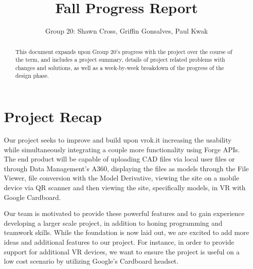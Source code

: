 \documentclass[10pt,draftclsnofoot,onecolumn]{IEEEtran}
\begin{document}
\title{Fall Progress Report}
\author{Group 20: Shawn Cross, Griffin Gonsalves, Paul Kwak}
\maketitle
\hspace*{\fill}\hspace*{\fill}
\vspace{2cm}
\begin{abstract}
This document expands upon Group 20's progress with the project over the course of the term, and includes a project summary, details of project related problems with changes and solutions, as well as a week-by-week breakdown of the progress of the design phase. 
\end{abstract}
\IEEEpeerreviewmaketitle

\newpage
{}

\section{Project Recap}
Our project seeks to improve and build upon vrok.it increasing the usability while simultaneously integrating a couple more functionality using Forge APIs. The end product will be capable of uploading CAD files via local user files or through Data Management’s A360, displaying the files as models through the File Viewer, file conversion with the Model Derivative, viewing the site on a mobile device via QR scanner and then viewing the site, specifically models, in VR with Google Cardboard.

Our team is motivated to provide these powerful features and to gain experience developing a larger scale project, in addition to honing programming and teamwork skills. While the foundation is now laid out, we are excited to add more ideas and additional features to our project. For instance, in order to provide support for additional VR devices, we want to ensure the project is useful on a low cost scenario by utilizing Google's Cardboard headset.
\end{document}
